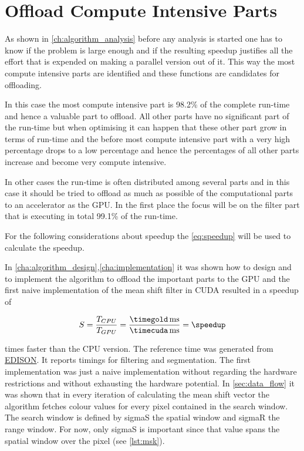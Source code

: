 \section{Offload Compute Intensive Parts}
\label{sec:offload_intensive}
\fpDiv{\speedup}{\timegold}{\timecuda}

As shown in \autoref{ch:algorithm_analysis} before any analysis is started one
has to know if the problem is large enough and if the resulting speedup
justifies all the effort that is expended on making a parallel version out of it.
This way the most compute intensive parts are identified and these functions
are candidates for offloading. 

In this case the most compute intensive part is 98.2\% of the complete run-time
and hence a valuable part to offload. All other parts have no significant part
of the run-time but when optimising it can happen that these other part grow in
terms of run-time and the before most compute intensive part with a very high
percentage drops to a low percentage and hence the percentages of all other
parts increase and become very compute intensive.

In other cases the run-time is often distributed among several parts and in this
case it should be tried to offload as much as possible of the computational parts
to an accelerator as the \gls{GPU}. In the first place the focus will be on the
filter part that is executing in total 99.1\% of the run-time.

For the following considerations about speedup the \autoref{eq:speedup} will be
used to calculate the speedup. 

In \autoref{cha:algorithm_design},\autoref{cha:implementation} it was shown how to design
and to implement the algorithm to offload the important parts to the \gls{GPU}
and the first naive implementation of the mean shift filter in \gls{CUDA}
resulted in a speedup of

\begin{equation*}\label{eq:speedup0}
	S = \frac{T_{CPU}}{T_{GPU}} = %
	\frac{\unit[\timegold]{ms}}{\unit[\timecuda]{ms}} = \speedup
\end{equation*}

times faster than the \gls{CPU} version. The reference time was generated from
\href{http://www.caip.rutgers.edu/riul/research/code.html}{ \gls{EDISON}}. It
reports timings for filtering and segmentation.
The first implementation was just a naive implementation without regarding the
hardware restrictions and without exhausting the hardware potential. In
\autoref{sec:data_flow} it was shown that in every iteration of calculating the
mean shift vector the algorithm fetches colour values for every pixel contained
in the search window. The search window is defined by \textsf{sigmaS} the
spatial window and \textsf{sigmaR} the range window. For now, only
\textsf{sigmaS} is important since that value spans the spatial window over
the pixel (see \autoref{lst:msk}). 



